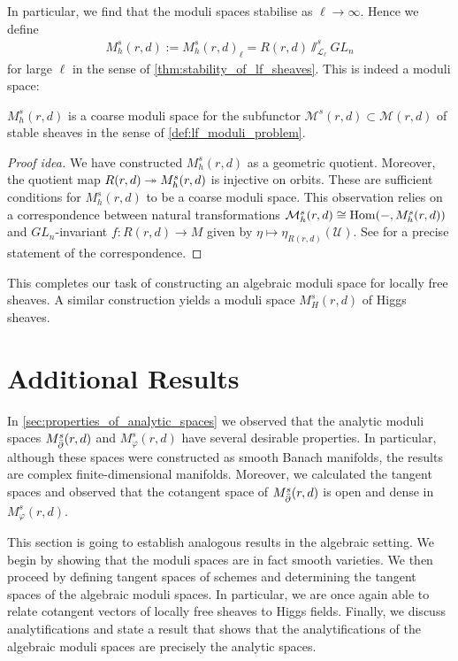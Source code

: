 \documentclass[12pt]{ociamthesis}  %
\begin{document}
In particular, we find that the moduli spaces stabilise as $\ell \to \infty$.
Hence we define
\begin{align}\label{eq:plain_algebraic_space}
  M^s_h(r,d) := M^s_h(r,d)_\ell = R(r,d)\sslash^s_{\mathscr L_\ell} GL_n
\end{align}
for large $\ell$ in the sense of \ref{thm:stability_of_lf_sheaves}.
This is indeed a moduli space:

\begin{corollary}
  $M^s_h(r,d)$ is a coarse moduli space for the subfunctor
  $\mathcal M^s(r,d)\subset\mathcal M(r,d)$ of stable sheaves in
  the sense of \ref{def:lf_moduli_problem}.
  \begin{proof}[Proof idea]
    We have constructed $M^s_h(r,d)$ as a geometric quotient. Moreover,
    the quotient map $R(r,d)\twoheadrightarrow M^s_h(r,d)$ is injective on
    orbits. These are sufficient conditions for $M^s_h(r,d)$
    to be a coarse moduli space. This observation relies on a correspondence between
    natural transformations $\mathcal M^s_h(r,d)\cong\operatorname{Hom}(-,M^s_h(r,d))$ and
    $GL_n$-invariant $f:R(r,d)\to M$ given by
    $\eta\mapsto\eta_{R(r,d)}(\mathscr U)$. See
    \cite[Proposition 3.35]{hoskins2016} for a precise statement
    of the correspondence.
  \end{proof}
\end{corollary}

This completes our task of constructing an algebraic moduli space
for locally free sheaves. A similar construction yields a moduli
space $M^s_H(r,d)$ of Higgs sheaves.

\section{Additional Results}

In \ref{sec:properties_of_analytic_spaces} we observed that the
analytic moduli spaces $M^s_{\bar{\partial}}(r,d)$ and $M^s_\varphi(r,d)$ have
several desirable properties. In particular, although
these spaces were constructed as smooth Banach manifolds, the results
are complex finite-dimensional manifolds. Moreover, we calculated
the tangent spaces and observed that the cotangent space of
$M^s_{\bar{\partial}}(r,d)$ is open and dense in $M^s_\varphi(r,d)$.

This section is going to establish analogous results in the algebraic
setting. We begin by showing that the moduli spaces are in fact
smooth varieties. We then proceed by defining tangent spaces of schemes
and determining the tangent spaces of the algebraic moduli spaces.
In particular, we are once again able to relate cotangent vectors
of locally free sheaves to Higgs fields. Finally, we discuss
analytifications and state a result that shows that the analytifications
of the algebraic moduli spaces are precisely the analytic spaces.
\end{document}
